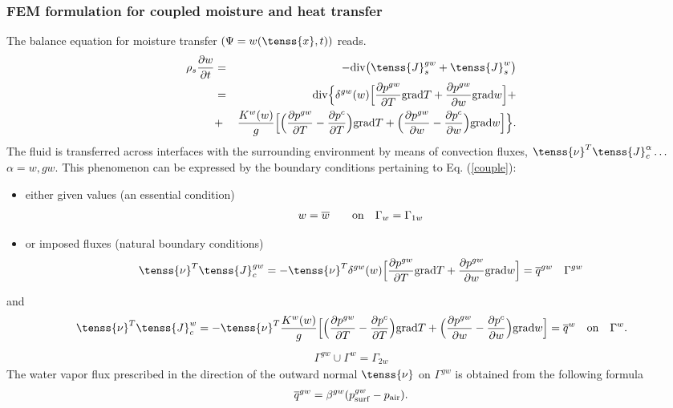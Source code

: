 \subsubsection{FEM formulation for coupled moisture and heat transfer}
\label{ssec_1_4_4}

The balance equation for moisture transfer $(\Psi = w(\tenss{x},t))$ reads.
\begin{eqnarray}\label{couple}
\rho_s \frac{\partial w}{\partial t} &=& - {\rm div} \big(\tenss{J}_s^{gw}+ \tenss{J}_s^w\big) \nonumber\\
&=& {\rm div} \Big\{ \delta^{gw}(w) \Big[ \frac{\partial p^{gw}}{\partial T} {\rm grad} T 
+ \frac{\partial p^{gw}}{\partial w} {\rm grad} w \Big] + \nonumber\\ &+& \frac{K^w(w)}{g} \Big[\Big(
\frac{\partial p^{gw}}{\partial T} - \frac{\partial p^{c}}{\partial T}\Big) {\rm grad} T
+ \Big(\frac{\partial p^{gw}}{\partial w} - \frac{\partial p^{c}}{\partial w}\Big) {\rm grad} w \Big]\Big\}.
\end{eqnarray}
The fluid is transferred across interfaces with the surrounding environment by means of convection 
fluxes, $\tenss{\nu}^T\tenss{J}_c^{\alpha} \dots$ $\alpha = w, gw$. This phenomenon can be expressed 
by the boundary conditions pertaining to Eq. (\ref{couple}):
\begin{itemize}
\item{either given values (an essential condition)}
\begin{eqnarray}
w=\overline{w} \qquad {\rm on} \quad \Gamma_w = \Gamma_{1w}
\end{eqnarray}
\item{or imposed fluxes (natural boundary conditions)}
\begin{eqnarray}
\tenss{\nu}^T \tenss{J}_c^{gw} = - \tenss{\nu}^T {\delta}^{gw}(w) \Big[ \frac{\partial 
p^{gw}}{\partial T} {\rm grad} T + \frac{\partial p^{gw}}{\partial w} {\rm grad} w \Big]
= \overline{q}^{gw} \quad \Gamma^{gw}
\end{eqnarray}
\end{itemize}
and
\begin{eqnarray}
\tenss{\nu}^T \tenss{J}_c^{w} = - \tenss{\nu}^T \frac{K^w(w)}{g} \Big[\Big(
\frac{\partial p^{gw}}{\partial T} - \frac{\partial p^{c}}{\partial T}\Big) {\rm grad} T
+ \Big(\frac{\partial p^{gw}}{\partial w} - \frac{\partial p^{c}}{\partial w}\Big) {\rm grad} w \Big]
= \overline{q}^{w} \quad {\rm on} \quad \Gamma^{w}\nonumber.
\end{eqnarray}
\begin{eqnarray}
{\Gamma^{gw} \cup \Gamma^w = \Gamma_{2w}}\nonumber
\end{eqnarray}	
The water vapor flux prescribed in the direction of the outward normal $\tenss{\nu}$ 
on $\Gamma^{gw}$ 
is obtained from the following formula \cite{ctu}
\begin{eqnarray}
\overline{q}^{gw} = \beta^{gw} (p_{\rm surf}^{gw} - p_{\rm air}).
\end{eqnarray}

